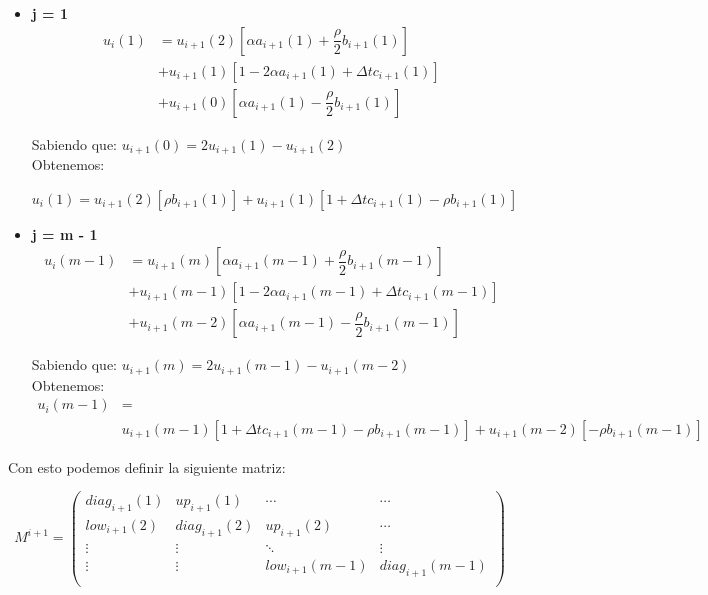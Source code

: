 \documentclass[titlepage]{article}
\begin{document}
\begin{itemize}
	\item \textbf{j = 1}
		\begin{align*}
			u_{i}(1) &= u_{i+1}(2)[\alpha a_{i+1}(1) + \dfrac{\rho}{2} b_{i+1}(1)] \\
			& + u_{i+1}(1)[1 - 2 \alpha	a_{i+1}(1) + \Delta t c_{i+1}(1)] \\
			& + u_{i+1}(0)[\alpha a_{i+1}(1) - \dfrac{\rho}{2} b_{i+1}(1)]
		\end{align*}
		
	Sabiendo que: $u_{i+1}(0) = 2u_{i+1}(1) - u_{i+1}(2)$ \\
	
	Obtenemos:
		\begin{center}
			$u_{i}(1) = u_{i+1}(2)[\rho b_{i+1}(1)] + u_{i+1}(1)[1 + \Delta t c_{i+1}(1) - \rho b_{i+1}(1)]$
		\end{center}
		
	\item \textbf{j = m - 1}
		\begin{align*}
			u_{i}(m - 1) &= u_{i+1}(m)[\alpha a_{i+1}(m - 1) + \dfrac{\rho}{2} b_{i+1}(m - 1)] \\
			& + u_{i+1}(m - 1)[1 - 2 \alpha	a_{i+1}(m - 1) + \Delta t c_{i+1}(m - 1)] \\
			& + u_{i+1}(m - 2)[\alpha a_{i+1}(m - 1) - \dfrac{\rho}{2} b_{i+1}(m - 1)]
		\end{align*}
		
	Sabiendo que: $u_{i+1}(m) = 2u_{i+1}(m - 1) - u_{i+1}(m - 2)$ \\
	
	Obtenemos:
		\begin{align*}
			u_{i}(m - 1) &= \\
			& u_{i+1}(m - 1)[1 + \Delta t c_{i+1}(m - 1) - \rho b_{i+1}(m - 1)] + u_{i+1}(m - 2)[-\rho b_{i+1}(m - 1)]
		\end{align*}

\end{itemize}

Con esto podemos definir la siguiente matriz:

\begin{center}
$$ M^{i+1} = 
	\begin{pmatrix}
		diag_{i+1}(1) & up_{i+1}(1) & \cdots & \cdots \\
		low_{i+1}(2) & diag_{i+1}(2) & up_{i+1}(2) & \cdots \\
		\vdots  & \vdots  & \ddots & \vdots  \\
		\vdots  & \vdots  & low_{i+1}(m - 1) & diag_{i+1}(m - 1) \\ 
	\end{pmatrix}
$$
\end{center}
\end{document}
